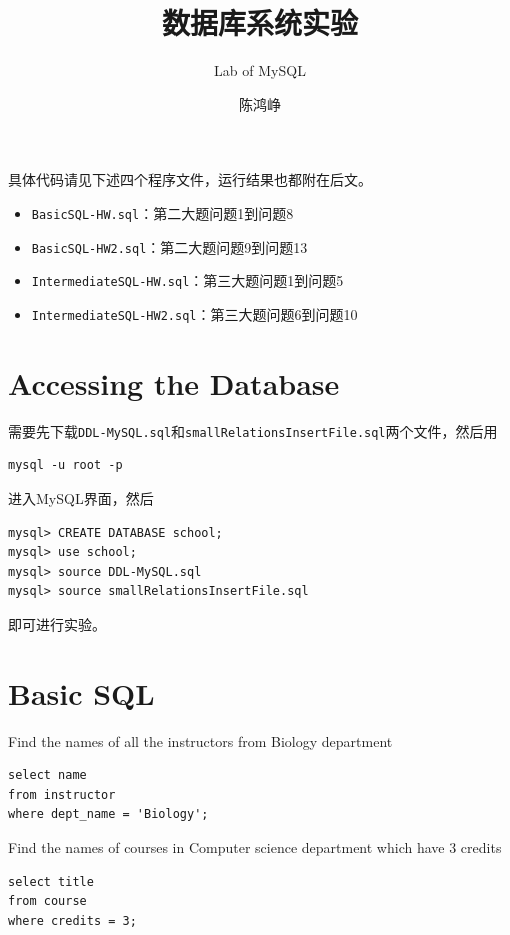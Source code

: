 \documentclass[logo,reportComp]{thesis}
\title{数据库系统实验}
\subtitle{Lab of MySQL}
\author{陈鸿峥}
\begin{document}
\maketitle

具体代码请见下述四个程序文件，运行结果也都附在后文。
\begin{itemize}
\item \verb'BasicSQL-HW.sql'：第二大题问题1到问题8
\item \verb'BasicSQL-HW2.sql'：第二大题问题9到问题13
\item \verb'IntermediateSQL-HW.sql'：第三大题问题1到问题5
\item \verb'IntermediateSQL-HW2.sql'：第三大题问题6到问题10
\end{itemize}

\section{Accessing the Database}
需要先下载\verb'DDL-MySQL.sql'和\verb'smallRelationsInsertFile.sql'两个文件，然后用
\begin{lstlisting}
mysql -u root -p
\end{lstlisting}
进入MySQL界面，然后
\begin{lstlisting}
mysql> CREATE DATABASE school;
mysql> use school;
mysql> source DDL-MySQL.sql
mysql> source smallRelationsInsertFile.sql
\end{lstlisting}
即可进行实验。

\section{Basic SQL}
\begin{question}
\normalfont Find the names of all the instructors from Biology department
\end{question}
\begin{answer}\mbox{}\par
\begin{lstlisting}
select name
from instructor
where dept_name = 'Biology';
\end{lstlisting}
\end{answer}

\begin{question}
\normalfont 
Find the names of courses in Computer science department which have 3 credits
\end{question}
\begin{answer}\mbox{}\par
\begin{lstlisting}
select title
from course
where credits = 3;
\end{lstlisting}
\end{answer}
\end{document}
